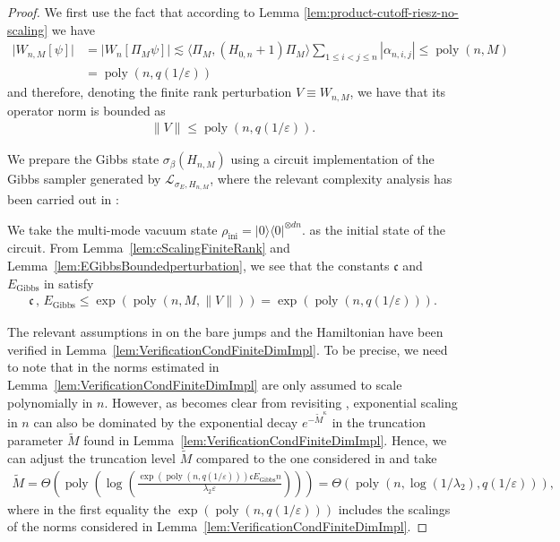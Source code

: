 \documentclass[11pt]{amsart}
\newcommand{\1}{\mathbbm{1}}
\newcommand{\kb}[1]{|#1\rangle\!\langle#1|}
\newcommand{\cL}{\mathcal{L}}
\newcommand{\eps}{\varepsilon}
\theoremstyle{plain}
\theoremstyle{definition}
\theoremstyle{remark}
\numberwithin{equation}{section}
\begin{document}
\begin{proof}


We first use the fact that according to Lemma \ref{lem:product-cutoff-riesz-no-scaling} we have
\begin{align*} \vert W_{n,M}[\psi]\vert &= \vert W_{n}[\Pi_M \psi]\vert \lesssim \langle \Pi_M,(H_{0,n}+1)\Pi_M\rangle\sum_{1\le i<j\le n}|\alpha_{n,i,j}|\le 
\operatorname{poly}(n,M)\\
&=\operatorname{poly}(n,q(1/\eps))  
\end{align*}
and therefore, denoting the finite rank perturbation $V\equiv W_{n,M}$, we have that its operator norm is bounded as
\begin{align}
    \|V\| \le \operatorname{poly}(n,q(1/\eps)).
\end{align}

We prepare the Gibbs state $\sigma_\beta(H_{n,M})$ using a circuit implementation of the Gibbs sampler generated by $\cL_{\sigma_E,H_{n,M}}$, where the relevant complexity analysis has been carried out in \cite[Corollary 4.33]{BeckerRouzeSalzmannToAppearcmp}: 

We take the multi-mode vacuum state $\rho_{\operatorname{ini}}= \kb{0}^{\otimes dn}.$ as the initial state of the circuit. From Lemma~\ref{lem:cScalingFiniteRank} and Lemma~\ref{lem:EGibbsBoundedperturbation}, we see that the constants $\mathfrak{c}$ and $E_{\operatorname{Gibbs}}$ in  \cite[Corollary 4.33]{BeckerRouzeSalzmannToAppearcmp}
satisfy
\begin{align*}
    \mathfrak{c}\,,\, E_{\operatorname{Gibbs}} \le \exp(\operatorname{poly}(n,M,\|V\|)) = \exp(\operatorname{poly}(n,q(1/\eps))).
\end{align*}

The relevant assumptions in \cite[Theorem 4.12 and Corollary 4.33]{BeckerRouzeSalzmannToAppearcmp} on the bare jumps and the Hamiltonian have been verified in Lemma~\ref{lem:VerificationCondFiniteDimImpl}. 
To be precise, we need to note that in \cite[Theorem 4.12 and Corollary 4.33]{BeckerRouzeSalzmannToAppearcmp} the norms estimated in Lemma~\ref{lem:VerificationCondFiniteDimImpl} are only assumed to scale polynomially in $n.$ However, as becomes clear from revisiting \cite[Equation 4.38 \& Propositions 4.7 and 4.11]{BeckerRouzeSalzmannToAppearcmp}, exponential scaling in $n$ can also be dominated by the exponential decay $e^{-\widetilde M^\kappa}$ in the truncation parameter $\widetilde M$ found in Lemma~\ref{lem:VerificationCondFiniteDimImpl}. Hence, we can adjust the truncation level $\widetilde M$ compared to the one considered in \cite[Corollary 4.13]{BeckerRouzeSalzmannToAppearcmp} and take
\begin{align*}
    \widetilde M = \Theta\left(\operatorname{poly}\left(\log\left(\frac{ \exp(\operatorname{poly}(n,q(1/\eps)))\mathfrak{c} E_{\operatorname{Gibbs}} n}{\lambda_2\eps}\right)\right)\right) = \Theta\left(\operatorname{poly}\left(n,\log\left(1/\lambda_2\right),q(1/\eps)\right)\right),
\end{align*}
where in the first equality the $\exp(\operatorname{poly}(n,q(1/\eps)))$ includes the scalings of the norms considered in Lemma~\ref{lem:VerificationCondFiniteDimImpl}.





\end{proof}
\end{document}
